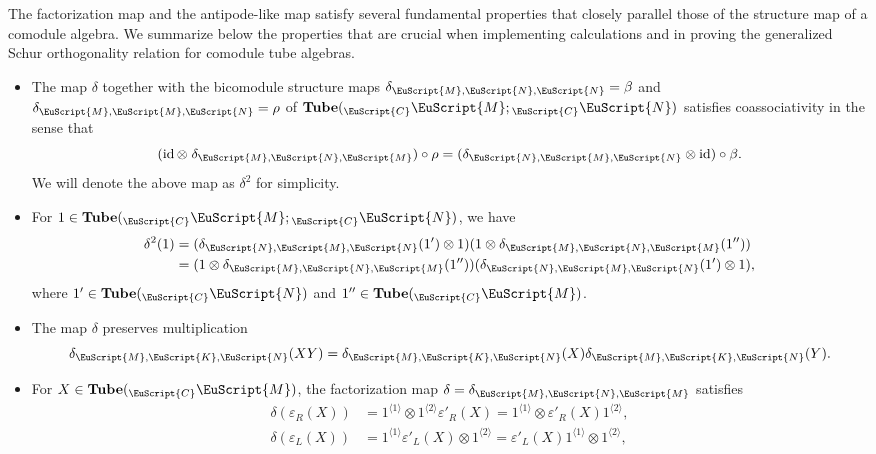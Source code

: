 \documentclass[a4paper,11pt]{article}
\theoremstyle{definition}
\theoremstyle{remark}
\newcommand\eC           {\EuScript{C}}
\newcommand\eK         {\EuScript{K}}
\newcommand\eM          {\EuScript{M}}
\newcommand\eN         {\EuScript{N}}
\newcommand{\id}{\operatorname{id}}
\newcommand{\Tube}{\mathbf{Tube}}
\begin{document}
The factorization map and the antipode-like map satisfy several fundamental properties that closely parallel those of the structure map of a comodule algebra. We summarize below the properties that are crucial when implementing calculations and in proving the generalized Schur orthogonality relation for comodule tube algebras. 
\begin{itemize}
    \item The map $\delta$ together with the bicomodule structure maps $\delta_{\eM,\eN,\eN} = \beta$ and $\delta_{\eM,\eM,\eN}=\rho$  of $\Tube({}_{\eC}\eM;{}_{\eC}\eN)$ satisfies coassociativity in the sense that 
    \begin{equation} \label{eq:coassociativity}
        (\id \otimes\; \delta_{\eM,\eN,\eM})\circ \rho=(\delta_{\eN,\eM,\eN}\otimes \id)\circ \beta.
    \end{equation}
    We will denote the above map as $\delta^2$ for simplicity.
    \item For $1\in \Tube({}_{\eC}\eM;{}_{\eC}\eN)$, we have
    \begin{equation} \label{eq:unit-trifold}
    \begin{aligned}
         \delta^2(1)&=(\delta_{\eN,\eM,\eN}(1') \otimes 1) (1\otimes \delta_{\eM,\eN,\eM}(1''))\\
         &=(1\otimes \delta_{\eM,\eN,\eM}(1'')) (\delta_{\eN,\eM,\eN}(1') \otimes 1),
    \end{aligned}
    \end{equation}
    where $1'\in\Tube({}_\eC\eN)$ and $1''\in\Tube({}_\eC\eM)$. 
    \item The map $\delta$ preserves multiplication 
    \begin{equation} \label{eq:preserve-product}
        \delta_{\eM,\eK,\eN}(XY)=\delta_{\eM,\eK,\eN}(X)\delta_{\eM,\eK,\eN}(Y).
    \end{equation}
    \item For $X\in \Tube({}_{\eC}\eM)$, the factorization map $\delta=\delta_{\eM,\eN,\eM}$ satisfies
    \begin{align}
        \delta(\varepsilon_R(X))&=1^{\langle 1 \rangle}\otimes 1^{\langle 2 \rangle}\varepsilon'_R(X)=1^{\langle 1 \rangle}\otimes \varepsilon'_R(X) 1^{\langle 2 \rangle}, \label{eq:epsilon-rho-1}\\
        \delta(\varepsilon_L(X))&=1^{\langle 1 \rangle}\varepsilon'_L(X)\otimes 1^{\langle 2 \rangle}=\varepsilon'_L(X) 1^{\langle 1 \rangle}\otimes 1^{\langle 2 \rangle}, \label{eq:epsilon-rho-2}
    \end{align}

\end{itemize}
\end{document}
